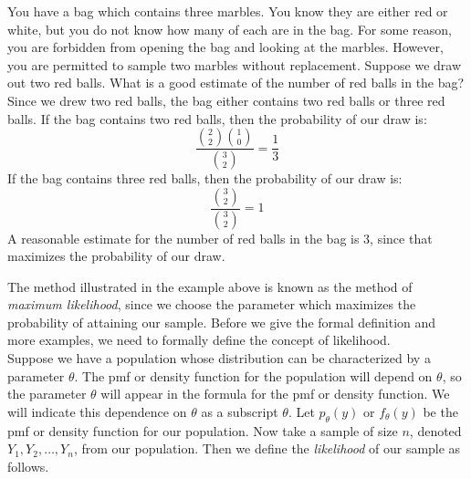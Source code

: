 \documentclass[notes.tex]{subfiles}
\begin{document}
\begin{example}You have a bag which contains three marbles. You know they are either red or white, but you do not know how many of each are in the bag. For some reason, you are forbidden from opening the bag and looking at the marbles. However, you are permitted to sample two marbles without replacement. Suppose we draw out two red balls. What is a good estimate of the number of red balls in the bag?\\

Since we drew two red balls, the bag either contains two red balls or three red balls. If the bag contains two red balls, then the probability of our draw is:
\[
\dfrac{\binom{2}{2}\binom{1}{0}}{\binom{3}{2}} = \frac{1}{3}
\]
If the bag contains three red balls, then the probability of our draw is:
\[
\dfrac{\binom{3}{2}}{\binom{3}{2}} = 1
\]
A reasonable estimate for the number of red balls in the bag is 3, since that maximizes the probability of our draw.
\end{example}
The method illustrated in the example above is known as the method of \emph{maximum likelihood}, since we choose the parameter which maximizes the probability of attaining our sample. Before we give the formal definition and more examples, we need to formally define the concept of likelihood.\\

Suppose we have a population whose distribution can be characterized by a parameter $\theta$. The pmf or density function for the population will depend on $\theta$, so the parameter $\theta$ will appear in the formula for the pmf or density function. We will indicate this dependence on $\theta$ as a subscript $\theta$. Let $p_\theta(y)$ or $f_\theta(y)$ be the pmf or density function for our population. Now take a sample of size $n$, denoted $Y_1, Y_2, \dots, Y_n$, from our population. Then we define the \emph{likelihood} of our sample as follows.
\end{document}
